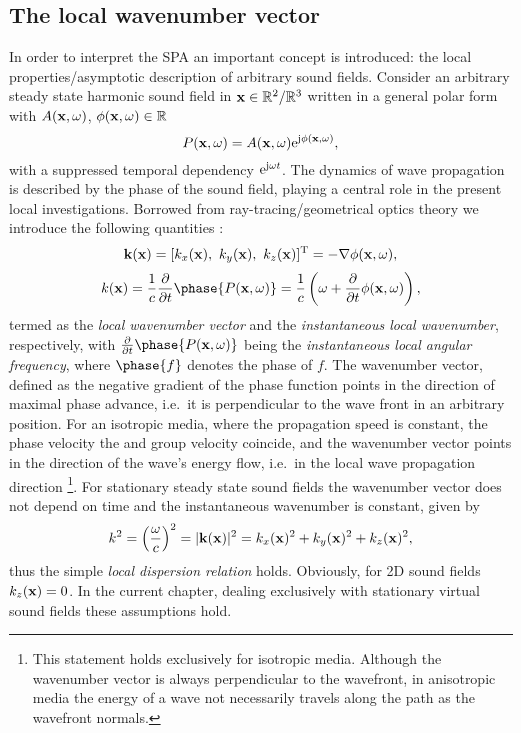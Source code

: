 \subsection{The local wavenumber vector}

In order to interpret the SPA an important concept is introduced: the local properties/asymptotic description of arbitrary sound fields.
Consider an arbitrary steady state harmonic sound field in $\mathbf{x} \in \mathbb{R}^2 / \mathbb{R}^3$ written in a general polar form with $A(\mathbf{x},\omega)$, $\phi(\mathbf{x},\omega) \in \mathbb{R}$
\begin{equation}
P(\mathbf{x},\omega) = A(\mathbf{x},\omega)\mathrm{e}^{\mathrm{j} \phi(\mathbf{x},\omega)},
\label{eq:25D_WFS:general_sf}
\end{equation}
%
with a suppressed temporal dependency $\mathrm{e}^{\mathrm{j} \omega t}$.
The dynamics of wave propagation is described by the phase of the sound field, playing a central role in the present local investigations.
Borrowed from ray-tracing/geometrical optics theory we introduce the following quantities \cite{Romer2005,Carozzi2004}:
%
\begin{equation}
\vk(\vx) = [k_x(\vx),\ k_y(\vx),\ k_z(\vx)]^{\mathrm{T}} = -\nabla \phi(\vx,\omega),
\end{equation}
%
\begin{equation}
k(\vx) =  \frac{1}{c} \frac{\partial}{\partial t} \phase{P(\vx,\omega)}  = \frac{1}{c} \left( \omega + \frac{\partial}{\partial t} \phi(\vx,\omega) \right),
\end{equation}
%
termed as the \emph{local wavenumber vector} and the \emph{instantaneous local wavenumber}, respectively, with $ \frac{\partial}{\partial t} \phase{P(\vx,\omega)} $ being the \emph{instantaneous local angular frequency}, where $\phase{f}$ denotes the phase of $f$.
The wavenumber vector, defined as the negative gradient of the phase function points in the direction of maximal phase advance, i.e.\ it is perpendicular to the wave front in an arbitrary position.
For an isotropic media, where the propagation speed is constant, the phase velocity the and group velocity coincide, and the wavenumber vector points in the direction of the wave's energy flow, i.e.\ in the local wave propagation direction \footnote{This statement holds exclusively for isotropic media.
Although the wavenumber vector is always perpendicular to the wavefront, in anisotropic media the energy of a wave not necessarily travels along the path as the wavefront normals\cite{Pollard1977}.}.
For stationary steady state sound fields the wavenumber vector does not depend on time and the instantaneous wavenumber is constant, given by 
\begin{equation}
k^2 = \left( \frac{\omega}{c} \right)^2 = |\mathbf{k}(\mathbf{x})|^2 = k_x(\mathbf{x})^2 + k_y(\mathbf{x})^2 + k_z(\mathbf{x})^2,
\end{equation}
thus the simple \emph{local dispersion relation } holds.
Obviously, for 2D sound fields $k_z(\mathbf{x})=0$.
In the current chapter, dealing exclusively with stationary virtual sound fields these assumptions hold.


